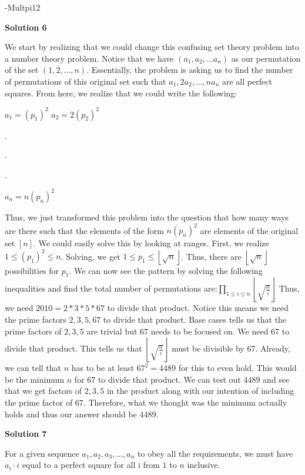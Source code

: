 \begin{enumerate}
 -Multpi12

 



\textbf{Solution 6}

We start by realizing that we could change this confusing set theory problem into a number theory problem. Notice that we have $(a_1, a_2, ... a_n)$ as our permutation of the set $(1, 2, ..., n)$. Essentially, the problem is asking us to find the number of permutations of this original set such that $a_1, 2a_2, ..., na_n$ are all perfect squares. From here, we realize that we could write the following:

 $a_1 = (p_1)^{2}$
$a_2 = 2(p_2)^{2}$

 .

 .

 .

 $a_n = n(p_n)^{2}$

 Thus, we just transformed this problem into the question that how many ways are there such that the elements of the form $n(p_n)^{2}$ are elements of the original set $[n]$. We could easily solve this by looking at ranges. First, we realize $1 \leq (p_1)^{2} \leq n$. Solving, we get $1 \leq p_1 \leq \left\lfloor \sqrt{n} \right\rfloor$. Thus, there are $\left\lfloor \sqrt{n} \right\rfloor$ possibilities for $p_1$. We can now see the pattern by solving the following inequalities and find the total number of permutations are:$\prod_{1 \leq i \leq n} \left\lfloor \sqrt{\frac{n}{i}} \right \rfloor$ Thus, we need $2010 = 2*3*5*67$ to divide that product. Notice this means we need the prime factors $2, 3, 5, 67$ to divide that product. Base cases tells us that the prime factors of $2, 3, 5$ are trivial but $67$ needs to be focused on. We need $67$ to divide that product. This tells us that $\left\lfloor \sqrt{\frac{n}{i}} \right \rfloor$ must be divisible by $67$. Already, we can tell that $n$ has to be at least $67^{2} = 4489$ for this to even hold. This would be the minimum $n$ for $67$ to divide that product. We can test out $4489$ and see that we get factors of $2, 3, 5$ in the product along with our intention of including the prime factor of $67$. Therefore, what we thought was the minimum actually holds and thus our answer should be $\boxed{4489}$. 

 



\textbf{Solution 7}

For a given sequence ${a_1,a_2,a_3,...,a_n}$ to obey all the requirements, we must have $a_i \cdot i$ equal to a perfect square for all i from $1$ to $n$ inclusive.


\end{enumerate}
